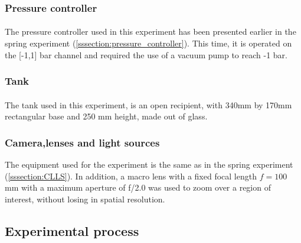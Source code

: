 \subsubsection{Pressure controller}
\paragraph{}
The pressure controller used in this experiment has been presented earlier in the spring experiment (\ref{sssection:pressure_controller}). This time, it is operated on the [-1,1] bar channel and required the use of a vacuum pump to reach -1 bar.
\subsubsection{Tank}
\paragraph{}
The tank used in this experiment, is an open recipient, with 340mm by 170mm rectangular base and 250 mm height, made out of glass.  
\subsubsection{Camera,lenses and light sources}
The equipment used for the experiment is the same as in the spring experiment (\ref{sssection:CLLS}). In addition, a macro lens with a fixed focal length $f= 100$ mm with a maximum aperture of f/2.0 was used to zoom over a region of interest, without losing in spatial resolution.
  
\subsection{Experimental process}
